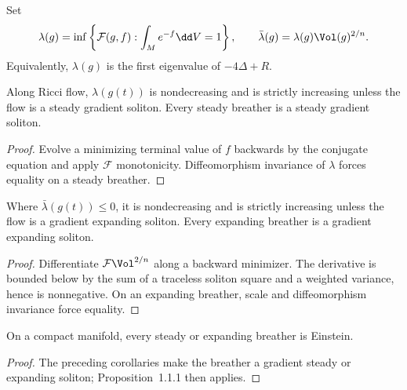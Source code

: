 Set
\[
\lambda(g)=\inf\left\{\mathcal F(g,f):\int_Me^{-f}\dd V=1\right\},
\qquad
\bar\lambda(g)=\lambda(g)\Vol(g)^{2/n}.
\]
Equivalently, $\lambda(g)$ is the first eigenvalue of $-4\Delta+R$.

\begin{corollary}
  \label{cor:cz-lambda-monotonicity-and-steady-breathers}
Along Ricci flow, $\lambda(g(t))$ is nondecreasing and is strictly
increasing unless the flow is a steady gradient soliton.  Every steady
breather is a steady gradient soliton.
\end{corollary}
\begin{proof}
\sketch Evolve a minimizing terminal value of $f$ backwards by the
conjugate equation and apply $\mathcal F$ monotonicity.  Diffeomorphism
invariance of $\lambda$ forces equality on a steady breather.
\end{proof}

\begin{corollary}
  \label{cor:cz-scale-invariant-lambda-monotonicity-and-expanding-breathers}
Where $\bar\lambda(g(t))\le0$, it is nondecreasing and is strictly
increasing unless the flow is a gradient expanding soliton.  Every
expanding breather is a gradient expanding soliton.
\end{corollary}
\begin{proof}
\sketch Differentiate $\mathcal F\Vol^{2/n}$ along a backward
minimizer.  The derivative is bounded below by the sum of a traceless
soliton square and a weighted variance, hence is nonnegative.  On an
expanding breather, scale and diffeomorphism invariance force equality.
\end{proof}

\begin{proposition}
  \label{prop:cz-steady-and-expanding-breathers-are-einstein}
On a compact manifold, every steady or expanding breather is Einstein.
\end{proposition}
\begin{proof}
\sketch The preceding corollaries make the breather a gradient steady
or expanding soliton; Proposition~1.1.1 then applies.
\end{proof}

